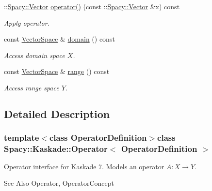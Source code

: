 \begin{DoxyCompactItemize}
\-::\hyperlink{classSpacy_1_1Vector}{Spacy\-::\-Vector} \hyperlink{classSpacy_1_1Kaskade_1_1Operator_a598da59e26cce77e41619ba554db5eb4}{operator()} (const \-::\hyperlink{classSpacy_1_1Vector}{Spacy\-::\-Vector} \&x) const 
\begin{DoxyCompactList}\small\item\em Apply operator. \end{DoxyCompactList}\item 
\hypertarget{classSpacy_1_1OperatorBase_a2588f9b3e0188820c4c494e63293dc6f}{const \hyperlink{classSpacy_1_1VectorSpace}{Vector\-Space} \& \hyperlink{classSpacy_1_1OperatorBase_a2588f9b3e0188820c4c494e63293dc6f}{domain} () const }\label{classSpacy_1_1OperatorBase_a2588f9b3e0188820c4c494e63293dc6f}

\begin{DoxyCompactList}\small\item\em Access domain space $X$. \end{DoxyCompactList}\item 
\hypertarget{classSpacy_1_1OperatorBase_ab19d3b7a6f290b1079248f1e567e53d6}{const \hyperlink{classSpacy_1_1VectorSpace}{Vector\-Space} \& \hyperlink{classSpacy_1_1OperatorBase_ab19d3b7a6f290b1079248f1e567e53d6}{range} () const }\label{classSpacy_1_1OperatorBase_ab19d3b7a6f290b1079248f1e567e53d6}

\begin{DoxyCompactList}\small\item\em Access range space $Y$. \end{DoxyCompactList}\end{DoxyCompactItemize}


\subsection{Detailed Description}
\subsubsection*{template$<$class Operator\-Definition$>$class Spacy\-::\-Kaskade\-::\-Operator$<$ Operator\-Definition $>$}

Operator interface for Kaskade 7. Models an operator $A:X\rightarrow Y$. 

\begin{DoxySeeAlso}{See Also}
Operator, Operator\-Concept 
\end{DoxySeeAlso}


